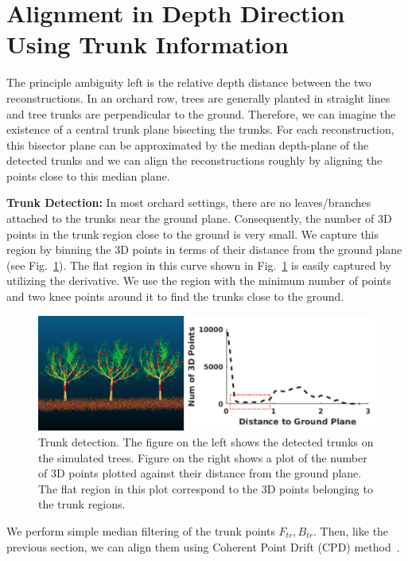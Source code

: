 \section{Alignment in Depth Direction Using Trunk Information}\label{sec:trunk alignment}

The principle ambiguity left is the relative depth distance between the two reconstructions. In an orchard row, trees are generally planted in straight lines and tree trunks are perpendicular to the ground. Therefore, we can imagine the existence of a central trunk plane bisecting the trunks. For each reconstruction, this bisector plane can be approximated by the median depth-plane of the detected trunks and we can align the reconstructions roughly by aligning the points close to this median plane.

\textbf{Trunk Detection:} In most orchard settings, there are no leaves/branches attached to the trunks near the ground plane. Consequently, the number of 3D points in the trunk region close to the ground is very small. We capture this region by binning the 3D points in terms of their distance from the ground plane (see Fig.~\ref{fig:trunkDetection}). The flat region in this curve shown in Fig.~\ref{fig:trunkDetection} is easily captured by utilizing the derivative. We use the region with the minimum number of points and two knee points around it to find the trunks close to the ground.

\begin{figure}[!thbp]
        \centering
            \includegraphics[width =0.80\columnwidth]{figures/merge_both/trunk_detection.pdf}           
   \caption[Trunk detection.]{Trunk detection. The figure on the left shows the detected trunks on the simulated trees. Figure on the right shows a plot of the number of 3D points plotted against their distance from the ground plane. The flat region in this plot correspond to the 3D points belonging to the trunk regions.}
   \label{fig:trunkDetection}
\end{figure}

We perform simple median filtering of the trunk points ${F}_{tr},{B}_{tr}$. Then, like the previous section, we can align them using Coherent Point Drift (CPD) method~\cite{myronenko2010point}.

